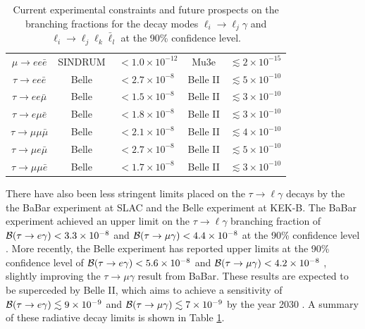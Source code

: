 {\begin{table}[t!]
\begin{tabular}{|c|cc|cc|}
$\mu\rightarrow ee\bar{e}$ & \multicolumn{1}{c|}{SINDRUM} & \,\,$<1.0\times10^{-12}$\cite{SINDRUM:1987nra} & \multicolumn{1}{c|}{Mu3e} & $\lesssim 2\times10^{-15}$\cite{Mu3e:2020gyw}\\ 
$\tau\rightarrow ee\bar{e}$       & \multicolumn{1}{c|}{Belle} & $<2.7\times10^{-8}$\cite{Hayasaka:2010np} & \multicolumn{1}{c|}{Belle II} & $\lesssim 5\times10^{-10}$\cite{Belle-II:2018jsg} \\
$\tau\rightarrow ee\bar{\mu}$     & \multicolumn{1}{c|}{Belle} & $<1.5\times10^{-8}$\cite{Hayasaka:2010np} & \multicolumn{1}{c|}{Belle II} & $\lesssim 3\times10^{-10}$\cite{Belle-II:2018jsg} \\ 
$\tau\rightarrow e\mu\bar{e}$     & \multicolumn{1}{c|}{Belle} & $<1.8\times10^{-8}$\cite{Hayasaka:2010np} & \multicolumn{1}{c|}{Belle II} & $\lesssim 3\times10^{-10}$\cite{Belle-II:2018jsg} \\ 
$\tau\rightarrow \mu\mu\bar{\mu}$ & \multicolumn{1}{c|}{Belle} & $<2.1\times10^{-8}$\cite{Hayasaka:2010np} & \multicolumn{1}{c|}{Belle II} & $\lesssim 4\times10^{-10}$\cite{Belle-II:2018jsg} \\ 
$\tau\rightarrow \mu e\bar{\mu}$  & \multicolumn{1}{c|}{Belle} & $<2.7\times10^{-8}$\cite{Hayasaka:2010np} & \multicolumn{1}{c|}{Belle II} & $\lesssim 5\times10^{-10}$\cite{Belle-II:2018jsg} \\ 
$\tau\rightarrow \mu \mu\bar{e}$  & \multicolumn{1}{c|}{Belle} & $<1.7\times10^{-8}$\cite{Hayasaka:2010np} & \multicolumn{1}{c|}{Belle II} & $\lesssim 3\times10^{-10}$\cite{Belle-II:2018jsg} \\ 
\hline
\end{tabular}\label{table:LFV_decay_limits}
\caption{Current experimental constraints and future prospects on the branching fractions for the decay modes $\ell_i \rightarrow \ell_j\gamma$ and $\ell_i \rightarrow \ell_j\ell_k\bar{\ell}_l$ at the 90\% confidence level.}
\end{table}
There have also been less stringent limits placed on the $\tau\rightarrow \ell\gamma$ decays by the the BaBar experiment at SLAC and the Belle experiment at KEK-B. The BaBar experiment achieved an upper limit on the $\tau \rightarrow \ell \gamma$ branching fraction of ${\cal B}(\tau \rightarrow e\gamma) < 3.3\times 10^{-8}$ and ${\cal B}(\tau \rightarrow \mu\gamma) < 4.4\times 10^{-8}$ at the 90\% confidence level \cite{BaBar:2010axs}. More recently, the Belle experiment has reported upper limits at the 90\% confidence level of ${\cal B}(\tau \rightarrow e\gamma) < 5.6\times 10^{-8}$ and ${\cal B}(\tau \rightarrow \mu\gamma) < 4.2\times 10^{-8}$ \cite{Belle:2021ysv}, slightly improving the $\tau \rightarrow \mu \gamma$ result from BaBar. These results are expected to be superceded by Belle II, which aims to achieve a sensitivity of ${\cal B}(\tau \rightarrow e\gamma) \lesssim 9\times 10^{-9}$ and ${\cal B}(\tau \rightarrow \mu\gamma) \lesssim 7\times 10^{-9}$ by the year 2030 \cite{Banerjee:2022vdd}. A summary of these radiative decay limits is shown in Table \ref{table:LFV_decay_limits}.

}
